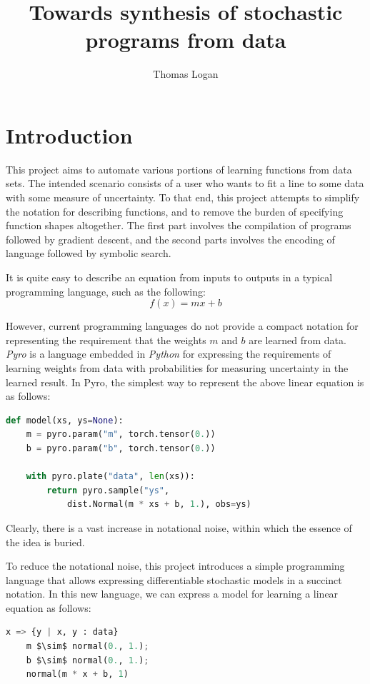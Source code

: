 \documentclass[letterpaper]{llncs}
\title{Towards synthesis of stochastic programs from data}
\author{Thomas Logan}
\institute{University of Texas at Austin}
\begin{document}
\pagestyle{plain}

\maketitle

\section{Introduction}
This project aims to automate various portions of learning functions from data sets. 
The intended scenario consists of a user who wants to fit a line to some data
with some measure of uncertainty. To that end, this project attempts 
to simplify the notation for describing functions, and 
to remove the burden of specifying function shapes altogether. The first
part involves the compilation of programs followed by gradient descent, 
and the second parts involves the encoding of language followed by symbolic search. 

It is quite easy to describe an equation
from inputs to outputs in a typical programming language, such as the following:
\[ f(x) = m x + b \] 

However, current programming languages do not provide a compact notation 
for representing the requirement that the weights $m$ and $b$ are learned from data.
\textit{Pyro} \cite{pyro} is a language embedded in \textit{Python} \cite{python} for 
expressing the requirements of learning weights from data 
with probabilities for measuring uncertainty in the learned result. 
In Pyro, the simplest way to represent the above linear equation is as follows: 

\begin{lstlisting}[language=Python]
def model(xs, ys=None):
    m = pyro.param("m", torch.tensor(0.))
    b = pyro.param("b", torch.tensor(0.))
    
    with pyro.plate("data", len(xs)):
        return pyro.sample("ys", 
            dist.Normal(m * xs + b, 1.), obs=ys)
\end{lstlisting}

Clearly, there is a vast increase in notational noise, within which the essence of the idea is buried. 

To reduce the notational noise, this project introduces a simple programming language 
that allows expressing differentiable stochastic models in a succinct notation. In this new language,
we can express a model for learning a linear equation as follows: 

\begin{lstlisting}[language=Python]
x => {y | x, y : data}
    m $\sim$ normal(0., 1.); 
    b $\sim$ normal(0., 1.); 
    normal(m * x + b, 1)
\end{lstlisting}
\end{document}
